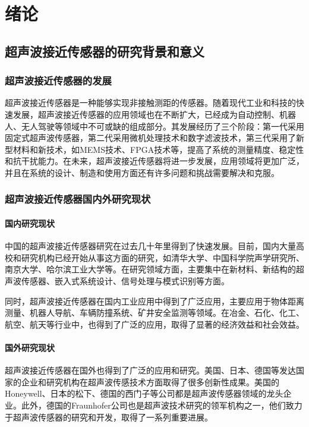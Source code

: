	\newpage
	\section{绪论}
    \subsection{超声波接近传感器的研究背景和意义}
    \subsubsection{超声波接近传感器的发展}
    超声波接近传感器是一种能够实现非接触测距的传感器。随着现代工业和科技的快速发展，超声波接近传感器的应用领域也在不断扩大，已经成为自动控制、机器人、无人驾驶等领域中不可或缺的组成部分。其发展经历了三个阶段：第一代采用固定式超声波传感器，第二代采用微机处理技术和数字滤波技术，第三代采用了新型材料和新技术，如MEMS技术、FPGA技术等，提高了系统的测量精度、稳定性和抗干扰能力。在未来，超声波接近传感器将进一步发展，应用领域将更加广泛，并且在系统的设计、制造和使用方面还有许多问题和挑战需要解决和克服。
    \subsubsection{超声波接近传感器国内外研究现状}
    \paragraph{国内研究现状}
    中国的超声波接近传感器研究在过去几十年里得到了快速发展。目前，国内大量高校和研究机构已经开始从事这方面的研究，如清华大学、中国科学院声学研究所、南京大学、哈尔滨工业大学等。在研究领域方面，主要集中在新材料、新结构的超声波传感器、嵌入式系统设计、信号处理与模式识别等方面。
    
    同时，超声波接近传感器在国内工业应用中得到了广泛应用，主要应用于物体距离测量、机器人导航、车辆防撞系统、矿井安全监测等领域。在冶金、石化、化工、航空、航天等行业中，也得到了广泛的应用，取得了显著的经济效益和社会效益。
    \paragraph{国外研究现状}
    超声波接近传感器在国外也得到了广泛的应用和研究。美国、日本、德国等发达国家的企业和研究机构在超声波传感技术方面取得了很多创新性成果。美国的Honeywell、日本的松下、德国的西门子等公司都是超声波传感器领域的龙头企业。此外，德国的Fraunhofer公司也是超声波技术研究的领军机构之一，他们致力于超声波传感器的研究和开发，取得了一系列重要进展。
    
